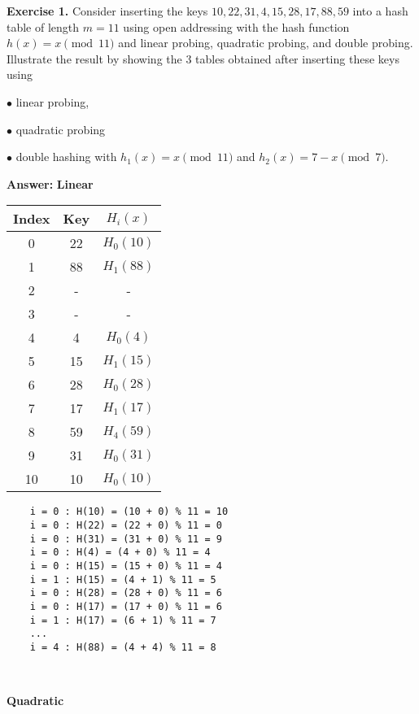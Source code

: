 \documentclass[11pt]{article}
\begin{document}
\textbf{Exercise 1.} Consider inserting the keys $10, 22, 31, 4, 15, 28, 17, 88, 59$ into a hash table of length $m=11$ using open addressing with the  hash function $h(x) = x \pmod{11}$ and linear probing, quadratic probing, and double probing. Illustrate  the result by showing the 3 tables obtained  after inserting these keys using 

$\bullet$ linear probing, 

$\bullet$ quadratic probing



$\bullet$ double hashing with $h_1(x) = x \pmod{11} $ and $h_2(x) = 7 - x \pmod{7}$.
  
\textbf{Answer:}
\newline
\newline
\textbf{Linear}
\begin{center}
\begin{tabular}{|c c c |} 
 \hline
 Index & Key & $H_i(x)$ \\ 
 \hline\hline
 0 & 22 &  $H_0(10)$ \\ 
\hline
 1 & 88 & $H_1(88)$ \\ 
 \hline
 2 & - & -  \\ 
 \hline
 3 & - & -  \\ 
 \hline
 4 & 4 & $H_0(4)$  \\ 
 \hline
 5 & 15 & $H_1(15)$  \\
  \hline
6 & 28 & $H_0(28)$  \\ 
 \hline
 7 & 17 & $H_1(17)$  \\ 
 \hline
 8 & 59 & $H_4(59)$   \\ 
 \hline
 9 & 31 & $H_0(31)$  \\
  \hline
10 & 10 & $H_0(10)$  \\
  \hline
\end{tabular}
\end{center}
\begin{verbatim}
    i = 0 : H(10) = (10 + 0) % 11 = 10 
    i = 0 : H(22) = (22 + 0) % 11 = 0 
    i = 0 : H(31) = (31 + 0) % 11 = 9
    i = 0 : H(4) = (4 + 0) % 11 = 4
    i = 0 : H(15) = (15 + 0) % 11 = 4
    i = 1 : H(15) = (4 + 1) % 11 = 5
    i = 0 : H(28) = (28 + 0) % 11 = 6
    i = 0 : H(17) = (17 + 0) % 11 = 6
    i = 1 : H(17) = (6 + 1) % 11 = 7
    ...
    i = 4 : H(88) = (4 + 4) % 11 = 8

    
\end{verbatim}
\pagebreak
\textbf{Quadratic}
\end{document}

